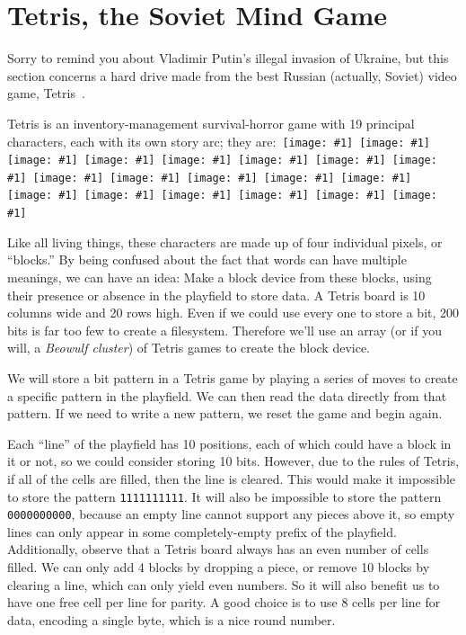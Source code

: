 \documentclass[twocolumn]{article}
\newcommand\tetrispiece[1]{\,\texttt{[image: \#1]}\hspace{0.1em}}
\newcommand\ivert{\tetrispiece{i_vert}}
\newcommand\ihoriz{\tetrispiece{i_horiz}}
\newcommand\squarepiece{\tetrispiece{square}}
\newcommand\tup{\tetrispiece{t_up}}
\newcommand\tdown{\tetrispiece{t_down}}
\newcommand\tleft{\tetrispiece{t_left}}
\newcommand\tright{\tetrispiece{t_right}}
\newcommand\jup{\tetrispiece{j_up}}
\newcommand\jleft{\tetrispiece{j_left}}
\newcommand\jdown{\tetrispiece{j_down}}
\newcommand\jright{\tetrispiece{j_right}}
\newcommand\zhoriz{\tetrispiece{z_horiz}}
\newcommand\zvert{\tetrispiece{z_vert}}
\newcommand\shoriz{\tetrispiece{s_horiz}}
\newcommand\svert{\tetrispiece{s_vert}}
\newcommand\lup{\tetrispiece{l_up}}
\newcommand\lleft{\tetrispiece{l_left}}
\newcommand\ldown{\tetrispiece{l_down}}
\newcommand\lright{\tetrispiece{l_right}}
\begin{document}
\section{Tetris, the Soviet Mind Game} \label{sec:tetris}

Sorry to remind you about Vladimir Putin's illegal invasion of
Ukraine, but this section concerns a hard drive made from the best
Russian (actually, Soviet) video game, Tetris~\cite{pajitnov1984tetris}.

Tetris is an inventory-management survival-horror game with 19
principal characters, each with its own story arc; they are: 
\ivert
\ihoriz
\squarepiece
\tup
\tdown
\tleft
\tright
\jup
\jleft
\jdown
\jright
\zhoriz
\zvert
\shoriz
\svert
\lup
\lleft
\ldown
\lright

Like all living things, these characters are made up of four
individual pixels, or ``blocks.'' By being confused about the fact
that words can have multiple meanings, we can have an idea: Make a
block device from these blocks, using their presence or absence in the
playfield to store data. A Tetris board is 10 columns wide and 20 rows
high. Even if we could use every one to store a bit, 200 bits is far
too few to create a filesystem. Therefore we'll use an array (or if
you will, a {\em Beowulf cluster}) of Tetris games to create the block
device.

We will store a bit pattern in a Tetris game by playing a series of
moves to create a specific pattern in the playfield. We can then read
the data directly from that pattern. If we need to write a new
pattern, we reset the game and begin again.

Each ``line'' of the playfield has 10 positions, each of which could
have a block in it or not, so we could consider storing 10 bits.
However, due to the rules of Tetris, if all of the cells are filled,
then the line is cleared. This would make it impossible to store the
pattern {\tt 1111111111}. It will also be impossible to store the
pattern {\tt 0000000000}, because an empty line cannot support any
pieces above it, so empty lines can only appear in some
completely-empty prefix of the playfield. Additionally, observe that a
Tetris board always has an even number of cells filled. We can only
add 4 blocks by dropping a piece, or remove 10 blocks by clearing a
line, which can only yield even numbers. So it will also benefit us to
have one free cell per line for parity. A good choice is to use 8
cells per line for data, encoding a single byte, which is a nice round
number.
\end{document}
